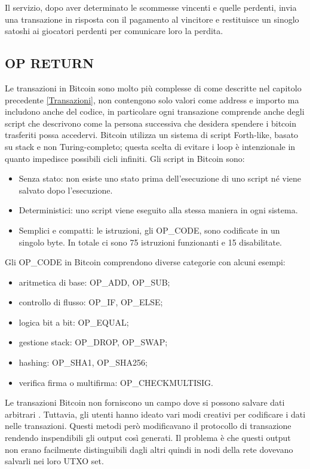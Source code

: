 Il servizio, dopo aver determinato le scommesse vincenti e quelle perdenti, invia una transazione in risposta con il pagamento al vincitore e restituisce un sinoglo satoshi ai giocatori perdenti per comunicare loro la perdita.
\subsection{OP RETURN}
Le transazioni in Bitcoin sono molto più complesse \cite{script} di come descritte nel capitolo precedente \ref{Transazioni}, non contengono solo valori come address e importo ma includono anche del codice, in particolare ogni transazione comprende anche degli script che descrivono come la persona successiva che desidera spendere i bitcoin trasferiti possa accedervi. Bitcoin utilizza un sistema di script Forth-like, basato su stack e non Turing-completo; questa scelta di evitare i loop è intenzionale in quanto impedisce possibili cicli infiniti. Gli script \cite{opcode} in Bitcoin sono:
\begin{itemize}
    \item Senza stato: non esiste uno stato prima dell'esecuzione di uno script né viene salvato dopo l'esecuzione.
    \item Deterministici: uno script viene eseguito alla stessa maniera in ogni sistema.
    \item Semplici e compatti: le istruzioni, gli OP\_CODE, sono codificate in un singolo byte. In totale ci sono 75 istruzioni funzionanti e 15 disabilitate.
\end{itemize}
Gli OP\_CODE in Bitcoin comprendono diverse categorie con alcuni esempi:
\begin{itemize}
    \item aritmetica di base: OP\_ADD, OP\_SUB;
    \item controllo di flusso: OP\_IF, OP\_ELSE;
    \item logica bit a bit: OP\_EQUAL;
    \item gestione stack: OP\_DROP, OP\_SWAP;
    \item hashing: OP\_SHA1, OP\_SHA256;
    \item verifica firma o multifirma: OP\_CHECKMULTISIG.
\end{itemize}

Le transazioni Bitcoin non forniscono un campo dove si possono salvare dati arbitrari \cite{arbdata}. Tuttavia, gli utenti hanno ideato vari modi creativi per codificare i dati nelle transazioni. Questi metodi però modificavano il protocollo di transazione rendendo inspendibili gli output così generati. Il problema è che questi output non erano facilmente distinguibili dagli altri quindi in nodi della rete dovevano salvarli nei loro UTXO set.

